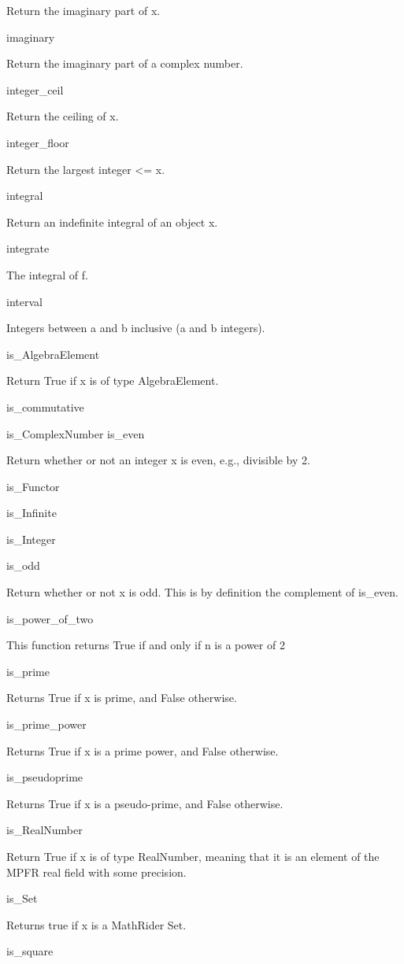 \documentclass[12pt,oneside]{book}
\begin{document}
Return the imaginary part of x.

imaginary

Return the imaginary part of a complex number.

integer\_ceil

Return the ceiling of x.

integer\_floor

Return the largest integer {\textless}= x.

integral \ \ \ \ 

Return an indefinite integral of an object x.

integrate \ \ \ \ 

The integral of f.

interval \ \ \ \ 

Integers between a and b inclusive (a and b integers).

is\_AlgebraElement

Return True if x is of type AlgebraElement.

is\_commutative


is\_ComplexNumber
is\_even

Return whether or not an integer x is even, e.g., divisible by 2.

is\_Functor 


is\_Infinite 


is\_Integer 


is\_odd 

Return whether or not x is odd. This is by definition the complement of is\_even.

is\_power\_of\_two

This function returns True if and only if n is a power of 2

is\_prime

Returns True if x is prime, and False otherwise.

is\_prime\_power \ \ \ \ 

Returns True if x is a prime power, and False otherwise.

is\_pseudoprime

Returns True if x is a pseudo{}-prime, and False otherwise.

is\_RealNumber

Return True if x is of type RealNumber, meaning that it is an element of the MPFR real field with some precision.

is\_Set

Returns true if x is a MathRider Set.

is\_square
\end{document}
